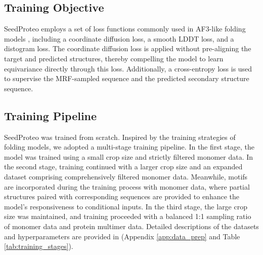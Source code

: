 \subsection{Training Objective}
SeedProteo employs a set of loss functions commonly used in AF3-like folding models \cite{abramsonAccurateStructurePrediction2024}, including a coordinate diffusion loss, a smooth LDDT loss, and a distogram loss. The coordinate diffusion loss is applied without pre-aligning the target and predicted structures, thereby compelling the model to learn equivariance directly through this loss. Additionally, a cross-entropy loss is used to supervise the MRF-sampled sequence and the predicted secondary structure sequence.

\subsection{Training Pipeline}
SeedProteo was trained from scratch. Inspired by the training strategies of folding models, we adopted a multi-stage training pipeline. In the first stage, the model was trained using a small crop size and strictly filtered monomer data. In the second stage, training continued with a larger crop size and an expanded dataset comprising comprehensively filtered monomer data. Meanwhile, motifs are incorporated during the training process with monomer data, where partial structures paired with corresponding sequences are provided to enhance the model’s responsiveness to conditional inputs. In the third stage, the large crop size was maintained, and training proceeded with a balanced 1:1 sampling ratio of monomer data and protein multimer data. Detailed descriptions of the datasets and hyperparameters are provided in (Appendix \ref{app:data_prep} and Table \ref{tab:training_stages}).






